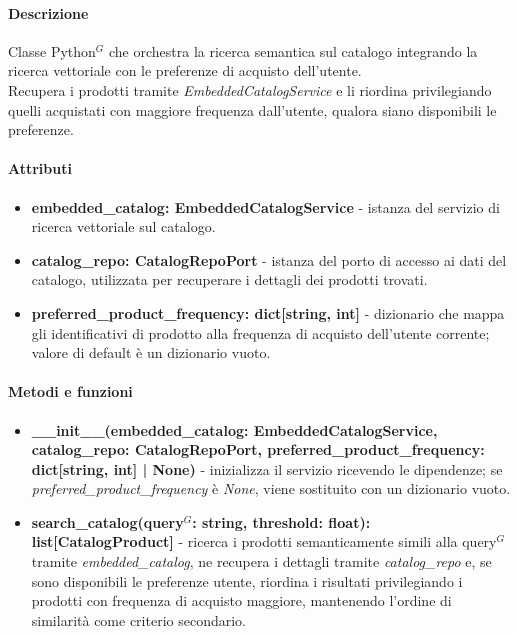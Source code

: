\paragraph{Descrizione}
Classe Python$^G$ che orchestra la ricerca semantica sul catalogo integrando la ricerca
vettoriale con le preferenze di acquisto dell'utente.\\
Recupera i prodotti tramite \textit{EmbeddedCatalogService} e li riordina privilegiando
quelli acquistati con maggiore frequenza dall'utente, qualora siano disponibili le
preferenze.

\paragraph{Attributi}
\begin{itemize}
	\item \textbf{embedded\_catalog: EmbeddedCatalogService} - istanza del servizio di
		ricerca vettoriale sul catalogo.
	\item \textbf{catalog\_repo: CatalogRepoPort} - istanza del porto di accesso ai dati
		del catalogo, utilizzata per recuperare i dettagli dei prodotti trovati.
	\item \textbf{preferred\_product\_frequency: dict[string, int]} - dizionario che
		mappa gli identificativi di prodotto alla frequenza di acquisto dell'utente
		corrente; valore di default è un dizionario vuoto.
\end{itemize}

\paragraph{Metodi e funzioni}
\begin{itemize}
	\item \textbf{\_\_init\_\_(embedded\_catalog: EmbeddedCatalogService, catalog\_repo:
		CatalogRepoPort, preferred\_product\_frequency: dict[string, int] | None)} -
		inizializza il servizio ricevendo le dipendenze; se
		\textit{preferred\_product\_frequency} è \textit{None}, viene sostituito con un
		dizionario vuoto.
	\item \textbf{search\_catalog(query$^G$: string, threshold: float): list[CatalogProduct]}
		- ricerca i prodotti semanticamente simili alla query$^G$ tramite
		\textit{embedded\_catalog}, ne recupera i dettagli tramite
		\textit{catalog\_repo} e, se sono disponibili le preferenze utente, riordina i
		risultati privilegiando i prodotti con frequenza di acquisto maggiore, mantenendo
		l'ordine di similarità come criterio secondario.
\end{itemize}

